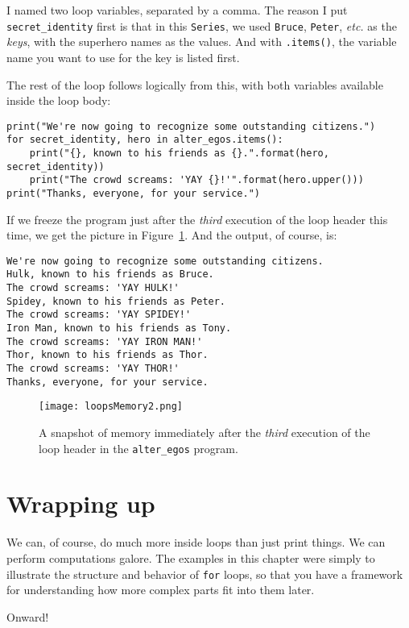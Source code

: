 I named two loop variables, separated by a comma. The reason I put
\texttt{secret\_identity} first is that in this \texttt{Series}, we used
\texttt{Bruce}, \texttt{Peter}, \textit{etc.} as the \textit{keys}, with the
superhero names as the values. And with \texttt{.items()}, the variable name
you want to use for the key is listed first.

The rest of the loop follows logically from this, with both variables available
inside the loop body:

\begin{Verbatim}[fontsize=\small,samepage=true,frame=single,framesep=3mm]
print("We're now going to recognize some outstanding citizens.")
for secret_identity, hero in alter_egos.items():
    print("{}, known to his friends as {}.".format(hero, secret_identity))
    print("The crowd screams: 'YAY {}!'".format(hero.upper()))
print("Thanks, everyone, for your service.")
\end{Verbatim}

If we freeze the program just after the \textit{third} execution of the loop
header this time, we get the picture in Figure~\ref{fig:loopsMemory2}. And the
output, of course, is:

\begin{Verbatim}[fontsize=\small,samepage=true,frame=leftline,framesep=5mm,framerule=1mm]
We're now going to recognize some outstanding citizens.
Hulk, known to his friends as Bruce.
The crowd screams: 'YAY HULK!'
Spidey, known to his friends as Peter.
The crowd screams: 'YAY SPIDEY!'
Iron Man, known to his friends as Tony.
The crowd screams: 'YAY IRON MAN!'
Thor, known to his friends as Thor.
The crowd screams: 'YAY THOR!'
Thanks, everyone, for your service.
\end{Verbatim}

\begin{figure}[ht]
\centering
\texttt{[image: loopsMemory2.png]}
\caption{A snapshot of memory immediately after the \textit{third} execution
of the loop header in the \texttt{alter\_egos} program.}
\label{fig:loopsMemory2}
\end{figure}

\section{Wrapping up}

We can, of course, do much more inside loops than just print things. We can
perform computations galore. The examples in this chapter were simply to
illustrate the structure and behavior of \texttt{for} loops, so that you have a
framework for understanding how more complex parts fit into them later.

Onward!
